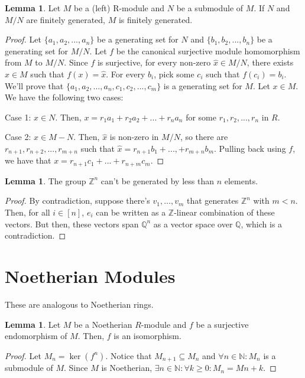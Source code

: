 \documentclass{article}
\theoremstyle{definition}
\newtheorem{lemma}[theorem]{Lemma}
\newcommand{\N}{\mathbb{N}}
\newcommand{\Z}{\mathbb{Z}}
\newcommand{\Q}{\mathbb{Q}}
\begin{document}
\begin{lemma}
    Let $M$ be a (left) R-module and $N$ be a submodule of $M$. If $N$ and $M/N$ are finitely generated, $M$ is finitely generated.
\end{lemma}
\begin{proof}
    Let $\{a_{1}, a_{2}, ..., a_{n}\}$ be a generating set for $N$ and $\{b_{1}, b_{2}, ..., b_{n}\}$ be a generating set for $M/N$. Let $f$ be the canonical surjective module homomorphism from $M$ to $M/N$. Since $f$ is surjective, for every non-zero $\hat{x} \in M/N$, there exists $x \in M$ such that $f(x) = \hat{x}$. For every $b_{i}$, pick some $c_{i}$ such that $f(c_{i}) = b_{i}$. We'll prove that $\{a_{1},a_{2},...,a_{n},c_{1},c_{2},...,c_{m}\}$ is a generating set for $M$. Let $x \in M$. We have the following two cases:

    Case 1: $x \in N$.
    Then, $x = r_{1}a_{1} + r_{2}a_{2} + ... + r_{n}a_{n}$ for some $r_{1},r_{2}, ..., r_{n}$ in $R$.

    Case 2: $x \in M - N$.
    Then, $\hat{x}$ is non-zero in $M/N$, so there are $r_{n+1}, r_{n+2}, ..., r_{m+n}$ such that $\hat{x} = r_{n+1}b_{1} + ... , + r_{m+n}b_{m}$. Pulling back using $f$, we have that $x = r_{n+1}c_{1} + ... + r_{n + m}c_{m}$.
\end{proof}

\begin{lemma}
    The group $\Z^{n}$ can't be generated by less than $ n $ elements.
\end{lemma}
\begin{proof}
    By contradiction, suppose there's $ v_{1}, \ldots, v_{m} $ that generates $ \Z^{n} $ with $ m < n $.
    Then, for all $ i \in [n] $, $ e_{i} $ can be written as a $ \Z $-linear combination of these vectors.
    But then, these vectors span $ \Q^{n} $ as a vector space over $ \Q $, which is a contradiction.
\end{proof}



\newpage

\section{Noetherian Modules}

These are analogous to Noetherian rings.

\begin{lemma}
    Let $M$ be a Noetherian $R$-module and $f$ be a surjective endomorphism of $M$.
    Then, $f$ is an isomorphism.
\end{lemma}
\begin{proof}
    Let $M_{n} = \ker(f^{n})$. Notice that $M_{n+1} \subseteq M_{n}$ and $\forall n \in \N:
    M_{n}$ is a submodule of $M$. Since $M$ is Noetherian, $\exists n \in \N: \forall k \geq 0:
    M_{n} = M{n + k}$. 
\end{proof}
\end{document}
